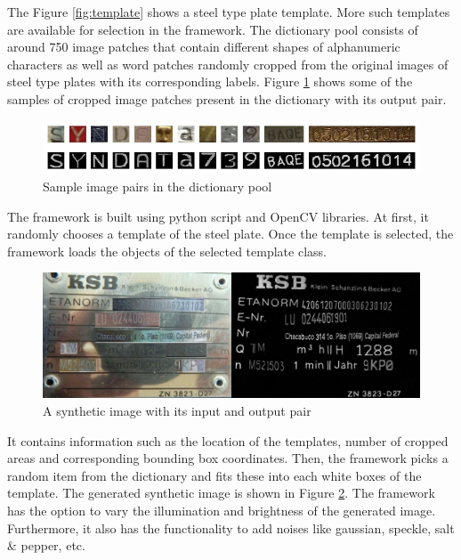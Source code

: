 	The Figure \ref{fig:template} shows a steel type plate template. More such templates are available for selection in the framework. The dictionary pool consists of around 750 image patches that contain different shapes of alphanumeric characters as well as word patches randomly cropped from the original images of steel type plates with its corresponding labels. Figure \ref{fig:syndata} shows some of the samples of cropped image patches present in the dictionary with its output pair.
\begin{figure}[H]
\centering
\includegraphics[width=5in]{images/syndata.jpg}
\caption{Sample image pairs in the dictionary pool}
\label{fig:syndata}
\end{figure}

The framework is built using python script and OpenCV libraries. At first, it randomly chooses a template of the steel plate. Once the template is selected, the framework loads the objects of the selected template class. 
\newline
\begin{figure}[H]
\centering
\includegraphics[width=5in]{images/synda1.jpg}
\caption{A synthetic image with its input and output pair}
\label{fig:syn}
\end{figure}

	It contains information such as the location of the templates, number of cropped areas and corresponding bounding box coordinates. Then, the framework picks a random item from the dictionary and fits these into each white boxes of the template. The generated synthetic image is shown in Figure \ref{fig:syn}. The framework has the option to vary the illumination and brightness of the generated image. Furthermore, it also has the functionality to add noises like gaussian, speckle, salt \& pepper, etc. 

